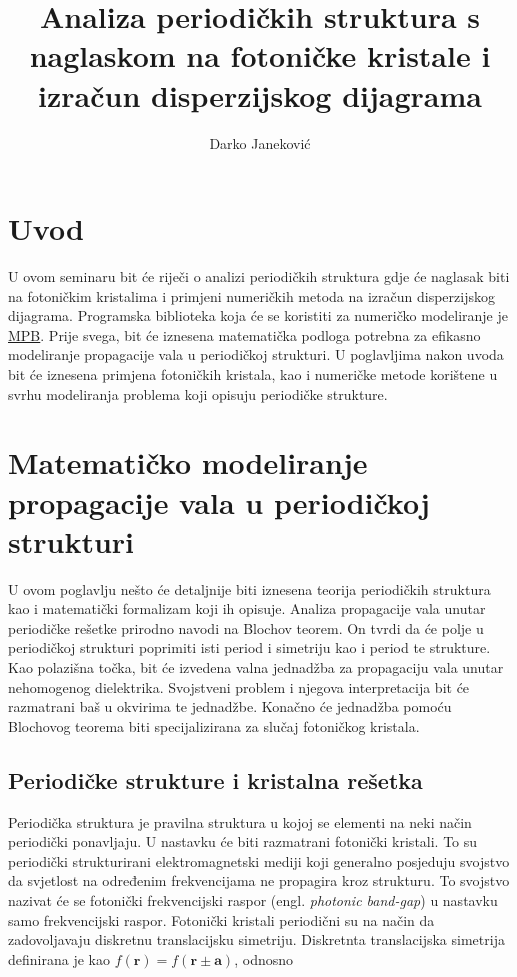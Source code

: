 \documentclass[utf8, seminar]{fer}
\begin{document}
\title{Analiza periodičkih struktura s naglaskom na fotoničke kristale
	   i izračun disperzijskog dijagrama}
\author{Darko Janeković}

\maketitle

\tableofcontents


\chapter{Uvod}
U ovom seminaru bit će riječi o analizi periodičkih struktura gdje će naglasak
biti na fotoničkim kristalima i primjeni numeričkih metoda na izračun
disperzijskog dijagrama. Programska biblioteka koja će se koristiti za numeričko
modeliranje je \href{https://github.com/stevengj/mpb}{MPB}. Prije svega, bit će
iznesena matematička podloga potrebna za efikasno modeliranje propagacije vala u
periodičkoj strukturi. U poglavljima nakon uvoda bit će iznesena primjena
fotoničkih kristala, kao i numeričke metode korištene u svrhu modeliranja
problema koji opisuju periodičke strukture.


\chapter{Matematičko modeliranje propagacije vala u periodičkoj strukturi}

U ovom poglavlju nešto će detaljnije biti iznesena teorija periodičkih struktura
kao i matematički formalizam koji ih opisuje. Analiza propagacije vala unutar
periodičke rešetke prirodno navodi na Blochov teorem. On tvrdi da će polje u
periodičkoj strukturi poprimiti isti period i simetriju kao i period te strukture.
Kao polazišna točka, bit će izvedena valna jednadžba za propagaciju vala unutar
nehomogenog dielektrika. Svojstveni problem i njegova interpretacija bit će
razmatrani baš u okvirima te jednadžbe. Konačno će jednadžba pomoću Blochovog
teorema biti specijalizirana za slučaj fotoničkog kristala.


\section{Periodičke strukture i kristalna rešetka}

Periodička struktura je pravilna struktura u kojoj se elementi na neki način
periodički ponavljaju. U nastavku će biti razmatrani fotonički kristali. To su
periodički strukturirani elektromagnetski mediji koji generalno posjeduju
svojstvo da svjetlost na određenim frekvencijama ne propagira kroz strukturu.
To svojstvo nazivat će se fotonički frekvencijski raspor (engl. \textit{photonic band-gap}) u nastavku samo frekvencijski raspor.
Fotonički kristali periodični su na način da zadovoljavaju diskretnu
translacijsku simetriju. Diskretnta translacijska simetrija definirana je kao
${f(\mathbf{r}) = f(\mathbf{r} \pm \mathbf{a})}$, odnosno
\end{document}
